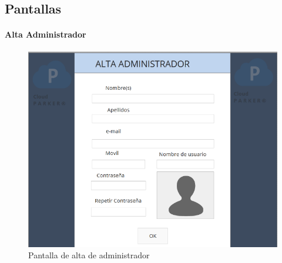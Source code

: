 \subsection{Pantallas}

	\paragraph{Alta Administrador}	
		
		\begin{figure}[h]
			\centering
			\includegraphics[scale=.5]{./requerimientosDeSoftware/mapasDeNavegacion/source/altaAdministrador2}
			\caption{Pantalla de alta de administrador}
			\label{md:altaAdministrador}
		\end{figure}